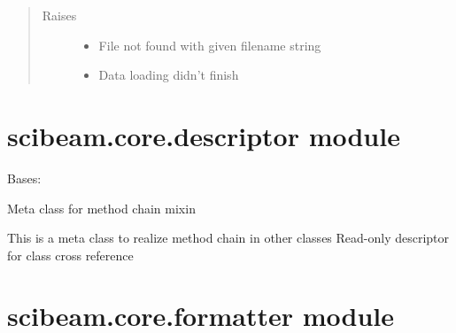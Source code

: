 \documentclass[letterpaper,10pt,english]{sphinxmanual}
\begin{document}
\begin{fulllineitems}
\begin{quote}
\begin{description}
\item[{Raises}] \leavevmode\begin{itemize}
\item {} 
 \textendash{} File not found with given filename string

\item {} 
 \textendash{} Data loading didn’t finish

\end{itemize}

\end{description}\end{quote}

\end{fulllineitems}



\section{scibeam.core.descriptor module}
\label{\detokenize{scibeam.core:module-scibeam.core.descriptor}}\label{\detokenize{scibeam.core:scibeam-core-descriptor-module}}

\begin{fulllineitems}
\label{\detokenize{scibeam.core:scibeam.core.descriptor.DescriptorMixin}}
Bases: 

Meta class for method chain mixin

This is a meta class to realize method chain in other classes
Read-only descriptor for class cross reference

\end{fulllineitems}



\section{scibeam.core.formatter module}
\label{\detokenize{scibeam.core:module-scibeam.core.formatter}}\label{\detokenize{scibeam.core:scibeam-core-formatter-module}}
\end{document}
